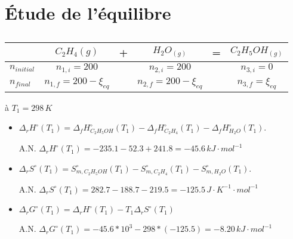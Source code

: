\documentclass[a4paper,12pt]{book}
\begin{document}
\renewcommand{\labelitemi}{$\blacktriangleright$}
\renewcommand{\labelitemii}{$\bullet$}


\section{Étude de l’équilibre}
\subsection{}

\begin{table}[h]
\begin{center}
    \begin{tabular}{l|ccccc}
    \hline
                      & $C_2H_4{(g)}$      & + & $H_2O_{(g)}$       & = & $C_2H_5OH_{(g)}$  \\ \hline
        $n_{initial}$ & $n_{1,i}=200$       &   & $n_{2,i}=200$      &   & $n_{3,i}=0$ \\ 
        $n_{final}$      & $n_{1,f}=200-\xi_{eq}$  &   & $n_{2,f}=200-\xi_{eq}$  &   & $n_{3,f}=\xi_{eq}$ \\ 
    \end{tabular}
\end{center}
\end{table}
à $T_1=298\,K$
\begin{itemize}
    \item $\Delta_rH^\circ(T_1)=\Delta_fH_{C_2H_5OH}^\circ(T_1)-\Delta_fH_{C_2H_4}^\circ(T_1)-\Delta_fH_{H_2O}^\circ(T_1)$. 
    
    \hspace*{\fill} 

    A.N. $\boxed{\Delta_rH^\circ(T_1)=-235.1-52.3+241.8=-45.6\,kJ\cdot mol^{-1}}$

    \hspace*{\fill} 

    \item $\Delta_rS^\circ(T_1)=S_{m,C_2H_5OH}^\circ(T_1)-S_{m,C_2H_4}^\circ(T_1)-S_{m,H_2O}^\circ(T_1)$. 
  
    \hspace*{\fill} 
  
    A.N. $\boxed{\Delta_rS^\circ(T_1)=282.7-188.7-219.5=-125.5\,J\cdot K^{-1}\cdot mol^{-1}}$

    \hspace*{\fill} 

    \item $\Delta_rG^\circ(T_1)=\Delta_rH^\circ(T_1)-T_1\Delta_rS^\circ(T_1)$
    
    \hspace*{\fill} 

    A.N. $\boxed{\Delta_rG^\circ(T_1)=-45.6*10^3-298*(-125.5)=-8.20\,kJ\cdot mol^{-1}}$
\end{itemize}
\end{document}
